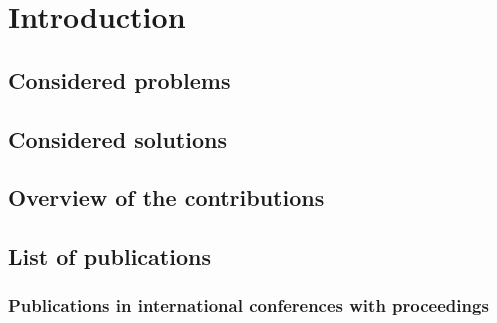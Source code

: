 
\chapter{Introduction}
\label{chapter:1}
\minitoc
\newpage
\graphicspath{{2-Chapters/1-Chapter/Images/}}

\section{Considered problems}
\label{sec:1:problems}



\section{Considered solutions}
\label{sec:1:solutions}



\section{Overview of the contributions}
\label{sec:1:contributions}



\section{List of publications}
\label{sec:1:contributions}

\subsection{Publications in international conferences with proceedings}

